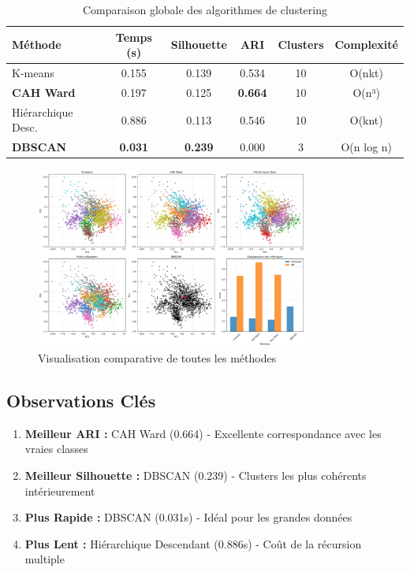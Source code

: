 \documentclass[12pt,a4paper]{article}
\begin{document}
\begin{table}[H]
\centering
\begin{tabular}{lccccc}
\toprule
\textbf{Méthode} & \textbf{Temps (s)} & \textbf{Silhouette} & \textbf{ARI} & \textbf{Clusters} & \textbf{Complexité} \\
\midrule
K-means & 0.155 & 0.139 & 0.534 & 10 & O(nkt) \\
\textbf{CAH Ward} & 0.197 & 0.125 & \textbf{0.664} & 10 & O(n³) \\
Hiérarchique Desc. & 0.886 & 0.113 & 0.546 & 10 & O(knt) \\
\textbf{DBSCAN} & \textbf{0.031} & \textbf{0.239} & 0.000 & 3 & O(n log n) \\
\bottomrule
\end{tabular}
\caption{Comparaison globale des algorithmes de clustering}
\label{tab:global_comparison}
\end{table}

\begin{figure}[H]
    \centering
    \includegraphics[width=0.8\textwidth]{partie3_comparaison_methodes.png}
    \caption{Visualisation comparative de toutes les méthodes}
    \label{fig:methods_comparison}
\end{figure}

\subsection{Observations Clés}

\begin{enumerate}
    \item \textbf{Meilleur ARI :} CAH Ward (0.664) - Excellente correspondance avec les vraies classes
    \item \textbf{Meilleur Silhouette :} DBSCAN (0.239) - Clusters les plus cohérents intérieurement
    \item \textbf{Plus Rapide :} DBSCAN (0.031s) - Idéal pour les grandes données
    \item \textbf{Plus Lent :} Hiérarchique Descendant (0.886s) - Coût de la récursion multiple
\end{enumerate}
\end{document}
